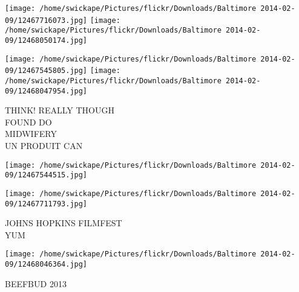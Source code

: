\documentclass[10pt,letterpaper]{article}
\begin{document}
\texttt{[image: /home/swickape/Pictures/flickr/Downloads/Baltimore 2014-02-09/12467716073.jpg]}
\texttt{[image: /home/swickape/Pictures/flickr/Downloads/Baltimore 2014-02-09/12468050174.jpg]}

\texttt{[image: /home/swickape/Pictures/flickr/Downloads/Baltimore 2014-02-09/12467545805.jpg]}
\texttt{[image: /home/swickape/Pictures/flickr/Downloads/Baltimore 2014-02-09/12468047954.jpg]}

THINK!  REALLY THOUGH\\
FOUND DO\\
MIDWIFERY\\
UN PRODUIT CAN\\
\pagebreak

\texttt{[image: /home/swickape/Pictures/flickr/Downloads/Baltimore 2014-02-09/12467544515.jpg]}

\vspace{0.25in}
\texttt{[image: /home/swickape/Pictures/flickr/Downloads/Baltimore 2014-02-09/12467711793.jpg]}

JOHNS HOPKINS FILMFEST\\
YUM\\
\pagebreak

\texttt{[image: /home/swickape/Pictures/flickr/Downloads/Baltimore 2014-02-09/12468046364.jpg]}

BEEFBUD 2013\\
\pagebreak
\end{document}
